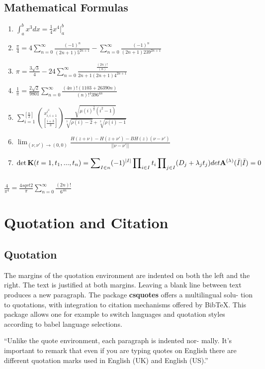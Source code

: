 \documentclass[titlepage]{article}
\begin{document}
\subsection{Mathematical Formulas}
\begin{enumerate}
\setlength{\itemindent}{-2em}
\item $\displaystyle \int_a^b x^3 dx = \frac14 x^4 \vert_a^b $
\item $\displaystyle \frac{\pi}{4} = 4 \sum_{n=0}^{\infty} \frac{(-1)^n}{(2n+1)5^{2n+1}} - \sum_{n=0}^{\infty} \frac{(-1)^n}{(2n+1)239^{2n+1}} $
\item $\displaystyle \pi = \frac{3 \sqrt3}{4} - 24 \sum_{n=0}^{\infty} \frac{ \frac{(2n)!}{(n)} }{2n+1(2n+1)4^{2n+1} }$
\item $\displaystyle \frac1\pi = \frac{2 \sqrt2}{9801} \sum_{n=0}^{\infty} \frac{ (4n)!(1103 + 26390n) } {(n)!^4 396^{4n} }$
\item $\displaystyle  \sum\nolimits_{i=1}^{[\frac{n}{2}]} \binom{x^{i^2}_{i,i+1}}{[\frac{i+3}{3}]} \frac{ \sqrt{\mu(i)^{\frac32}(i^2-1) } } {\sqrt[3]{\rho(i) - 2} + \sqrt[3]{\rho(i) - 1} } $
\item $\displaystyle  \lim_{(\nu,\nu') \to (0,0)} \frac {H(z + \nu) - H(z + \nu') - BH(z)(\nu - \nu')} {\vert\vert \nu - \nu' \vert\vert}$
\item $\displaystyle  \det \mathbf{K} (t=1,t_1,...,t_n) = \sum\nolimits_{I \in n}^{} (-1)^{\vert I \vert} \sideset{}{_{i \in I}}\prod_{}^{} t_i \sideset{}{_{j \in I}} \prod_{}^{} (D_j + \lambda_j t_j) det \mathbf{A}^{(\lambda)} (\bar{I}\vert\bar{I}) = 0$

\end{enumerate}
$\frac{4}{\pi^4} = \frac{4sqrt2}{\pi} \sum\limits_{n=0}^{\infty} \frac{(2n)!}{6^{4n}}$

\section{Quotation and Citation}
\subsection{Quotation}
The margins of the quotation environment are indented on both the left and the right. The text is justified at both margins. Leaving a blank line between text produces a new paragraph. The package \textbf{csquotes} offers a multilingual solu- tion to quotations, with integration to citation mechanisms offered by BibTeX. This package allows one for example to switch languages and quotation styles according to babel language selections.
\begin{displayquote}
\hspace{1em}``Unlike the quote environment, each paragraph is indented nor- mally. It's important to remark that even if you are typing quotes on English there are different quotation marks used in English (UK) and English (US).''
\end{displayquote}
\end{document}
